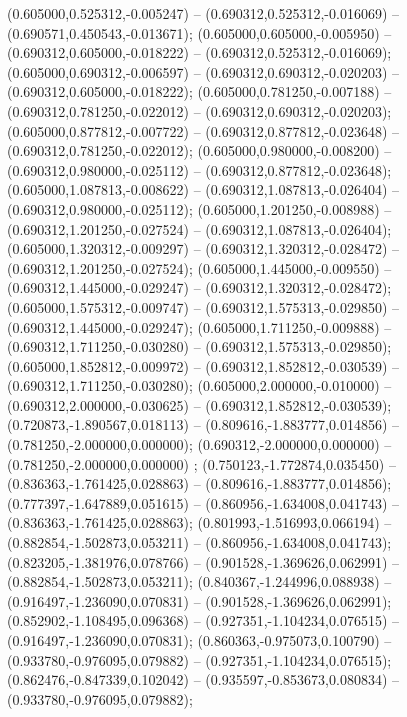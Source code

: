  (0.605000,0.525312,-0.005247) -- (0.690312,0.525312,-0.016069) -- (0.690571,0.450543,-0.013671);
 (0.605000,0.605000,-0.005950) -- (0.690312,0.605000,-0.018222) -- (0.690312,0.525312,-0.016069);
 (0.605000,0.690312,-0.006597) -- (0.690312,0.690312,-0.020203) -- (0.690312,0.605000,-0.018222);
 (0.605000,0.781250,-0.007188) -- (0.690312,0.781250,-0.022012) -- (0.690312,0.690312,-0.020203);
 (0.605000,0.877812,-0.007722) -- (0.690312,0.877812,-0.023648) -- (0.690312,0.781250,-0.022012);
 (0.605000,0.980000,-0.008200) -- (0.690312,0.980000,-0.025112) -- (0.690312,0.877812,-0.023648);
 (0.605000,1.087813,-0.008622) -- (0.690312,1.087813,-0.026404) -- (0.690312,0.980000,-0.025112);
 (0.605000,1.201250,-0.008988) -- (0.690312,1.201250,-0.027524) -- (0.690312,1.087813,-0.026404);
 (0.605000,1.320312,-0.009297) -- (0.690312,1.320312,-0.028472) -- (0.690312,1.201250,-0.027524);
 (0.605000,1.445000,-0.009550) -- (0.690312,1.445000,-0.029247) -- (0.690312,1.320312,-0.028472);
 (0.605000,1.575312,-0.009747) -- (0.690312,1.575313,-0.029850) -- (0.690312,1.445000,-0.029247);
 (0.605000,1.711250,-0.009888) -- (0.690312,1.711250,-0.030280) -- (0.690312,1.575313,-0.029850);
 (0.605000,1.852812,-0.009972) -- (0.690312,1.852812,-0.030539) -- (0.690312,1.711250,-0.030280);
 (0.605000,2.000000,-0.010000) -- (0.690312,2.000000,-0.030625) -- (0.690312,1.852812,-0.030539);
 (0.720873,-1.890567,0.018113) -- (0.809616,-1.883777,0.014856) -- (0.781250,-2.000000,0.000000);
 (0.690312,-2.000000,0.000000) -- (0.781250,-2.000000,0.000000) ;
 (0.750123,-1.772874,0.035450) -- (0.836363,-1.761425,0.028863) -- (0.809616,-1.883777,0.014856);
 (0.777397,-1.647889,0.051615) -- (0.860956,-1.634008,0.041743) -- (0.836363,-1.761425,0.028863);
 (0.801993,-1.516993,0.066194) -- (0.882854,-1.502873,0.053211) -- (0.860956,-1.634008,0.041743);
 (0.823205,-1.381976,0.078766) -- (0.901528,-1.369626,0.062991) -- (0.882854,-1.502873,0.053211);
 (0.840367,-1.244996,0.088938) -- (0.916497,-1.236090,0.070831) -- (0.901528,-1.369626,0.062991);
 (0.852902,-1.108495,0.096368) -- (0.927351,-1.104234,0.076515) -- (0.916497,-1.236090,0.070831);
 (0.860363,-0.975073,0.100790) -- (0.933780,-0.976095,0.079882) -- (0.927351,-1.104234,0.076515);
 (0.862476,-0.847339,0.102042) -- (0.935597,-0.853673,0.080834) -- (0.933780,-0.976095,0.079882);
